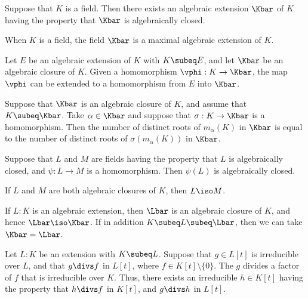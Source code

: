 \documentclass{article}
\begin{document}
  \begin{ttheorem}
    Suppose that \( K \) is a field. Then there exists an algebraic extension \( \Kbar \) of \( K \) having the property that \( \Kbar \) is algebraically closed.
  \end{ttheorem}

  \begin{tcorollary}
    When \( K \) is a field, the field \( \Kbar \) is a maximal algebraic extension of \( K \).
  \end{tcorollary}

  \begin{ttheorem}
    Let \( E \) be an algebraic extension of \( K \) with \( K\subeq E \), and let \( \Kbar \) be an algebraic closure of \( K \). Given a homomorphism \( \vphi:K\to \Kbar \), the map \( \vphi \) can be extended to a homomorphism from \( E \) into \( \Kbar \).
  \end{ttheorem}

  \begin{tcorollary}
    Suppose that \( \Kbar \) is an algebraic closure of \( K \), and assume that \( K\subeq \Kbar \). Take \( \alpha\in \Kbar \) and suppose that \( \sigma:K\to \Kbar \) is a homomorphism. Then the number of distinct roots of \( m_\alpha(K) \) in \( \Kbar \) is equal to the number of distinct roots of \( \sigma(m_\alpha(K)) \) in \( \Kbar \).
  \end{tcorollary}

  \begin{tproposition}
    Suppose that \( L \) and \( M \) are fields having the property that \( L \) is algebraically closed, and \( \psi : L \to M \) is a homomorphism. Then \( \psi(L) \) is algebraically closed.
  \end{tproposition}

  \begin{tproposition}
    If \( L \) and \( M \) are both algebraic closures of \( K \), then \( L \iso M \).
  \end{tproposition}

  \begin{tproposition}
    If \( L:K \) is an algebraic extension, then \( \Lbar \) is an algebraic closure of \( K \), and hence \( \Lbar\iso\Kbar \). If in addition \( K\subeq L\subeq \Lbar \), then we can take \( \Kbar = \Lbar \).
  \end{tproposition}

  \begin{tproposition}
    Let \( L:K \) be an extension with \( K\subeq L \). Suppose that \( g\in L[t] \) is irreducible over \( L \), and that \( g\divs f \) in \( L[t] \), where \( f\in K[t]\setminus \{ 0 \} \). The \( g \) divides a factor of \( f \) that is irreducible over \( K \). Thus, there exists an irreducible \( h\in K[t] \) having the property that \( h\divs f \) in \( K[t] \), and \( g\divs h \) in \( L[t] \).
  \end{tproposition}
\end{document}

